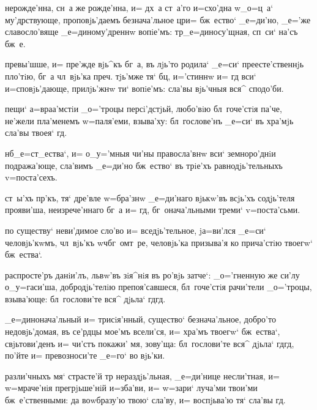 { нерожде'нна, сн~а же рожде'нна, и= дх~а 
ст~а'го и=схо'дна w\т _о=ц~а` му'дрствующе, 
проповjь'даемъ безнача'льное цр и= бж~ество` 
_е=ди'но, _е='же славосло'вяще _е=диному'дреннw вопiе'мъ: 
тр _е=диносу'щная, сп~си` на'съ бж~е.

  
превы'шше, и= пре'жде вjь^къ бг~а, въ лjь'то родила` 
_е=си` преесте'ственнjь пло'тiю, бг~а чл~вjь'ка 
преч. тjь'мже тя` бц, и='стиннw и= гд 
вси` и=сповjь'дающе, прилjь'жнw ти` вопiе'мъ: сла'вы 
вjь'чныя вся^ сподо'би.


  пещи` а=враа'мстiи _о='троцы 
персi'дстjьй, любо'вiю бл~гоче'стiя па'че, не'жели 
пла'менемъ w=паля'еми, взыва'ху: бл~гослове'нъ _е=си` въ 
хра'мjь сла'вы твоея` гд.

 нб _е=ст_ества`, и= о_у='мныя 
чи'ны правосла'внw вси` земноро'днiи подража'юще, 
сла'вимъ _е=ди'но бж~ество` въ трiе'хъ равнодjь'тельныхъ 
v=поста'сехъ. 

  ст~ы'хъ пр'къ, тя` дре'вле 
w=бра'знw _е=ди'наго вjькw'въ всjь'хъ содjь'теля 
прояви'ша, неизрече'ннаго бг~а и= гд, бг~онача'льными 
треми` v=поста'сьми.

  по существу` неви'димое 
сло'во и= вседjь'тельное, jа=ви'лся _е=си` человjь'кwмъ, 
чл~вjь'къ w\т ч бг~омт~ре, человjь'ка призыва'я ко 
прича'стiю твоегw` бж~ества`.


  распросте'ръ данiи'лъ, львw'въ 
зiя^нiя въ ро'вjь затче`: _о='гненную же си'лу 
о_у=гаси'ша, добродjь'телiю препоя'савшеся, бл~гоче'стiя 
рачи'тели _о='троцы, взыва'юще: бл~гослови'те вся^ дjьла` 
гд гд.

 _е=динонача'льный и= трисiя'нный, 
существо` безнача'льное, добро'то недовjь'домая, въ 
се'рдцы мое'мъ всели'ся, и= хра'мъ твоегw` бж~ества`, 
свjьтови'денъ и= чи'стъ покажи' мя, зову'ща: 
бл~гослови'те вся^ дjьла` гд гд, по'йте и= 
превозноси'те _е=го` во вjь'ки.

  разли'чныхъ мя` страсте'й тр 
нераздjь'льная, _е=ди'нице несли'тная, и= w=мраче'нiя 
прегрjьше'нiй и=зба'ви, и= w=зари` луча'ми твои'ми 
бж~е'ственными: да воwбразу'ю твою` сла'ву, и= воспjьва'ю 
тя` сла'вы гд.

}
